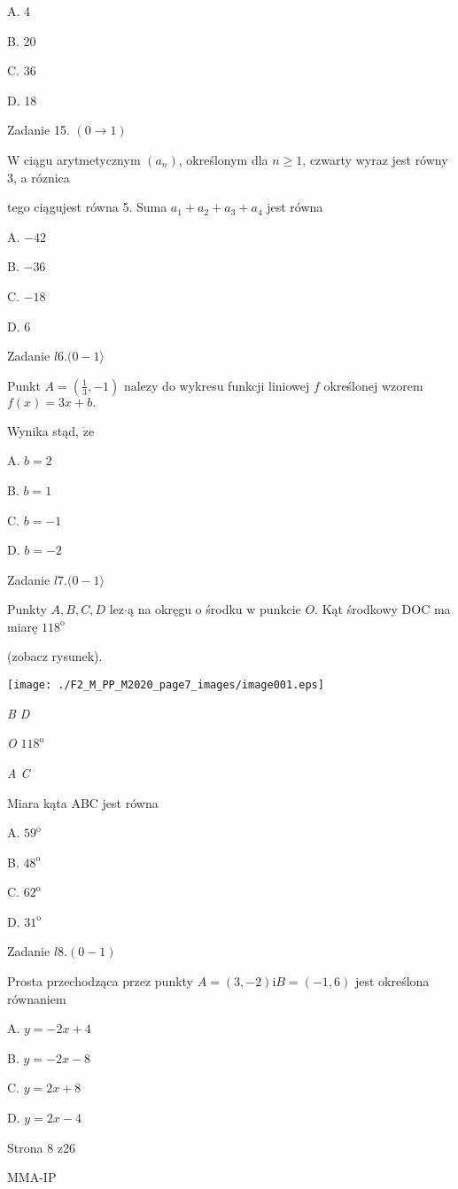 \documentclass[a4paper,12pt]{article}
\begin{document}
A. 4

B. 20

C. 36

D. 18

Zadanie 15. $(0\rightarrow 1)$

$\mathrm{W}$ ciągu arytmetycznym $(a_{n})$, określonym dla $n\geq 1$, czwarty wyraz jest równy 3, a róznica

tego ciągujest równa 5. Suma $a_{1}+a_{2}+a_{3}+a_{4}$ jest równa

A. $-42$

B. $-36$

C. $-18$

D. 6

Zadanie $l6. (0-1\rangle$

Punkt $A=(\displaystyle \frac{1}{3},-1)$ nalezy do wykresu funkcji liniowej $f$ określonej wzorem $f(x)=3x+b.$

Wynika stąd, $\dot{\mathrm{z}}\mathrm{e}$

A. $b=2$

B. $b=1$

C. $b=-1$

D. $b=-2$

Zadanie $l7. (0-1\rangle$

Punkty $A, B, C, D$ lez$\cdot$ą na okręgu o środku w punkcie $O$. Kąt środkowy DOC ma miarę $118^{\mathrm{o}}$

(zobacz rysunek).
\begin{center}
\texttt{[image: ./F2\_M\_PP\_M2020\_page7\_images/image001.eps]}
\end{center}
{\it B D}

{\it O}  $118^{\mathrm{o}}$

{\it A C}

Miara kąta ABC jest równa

A. $59^{\mathrm{o}}$

B. $48^{\mathrm{o}}$

C. $62^{\mathrm{o}}$

D. $31^{\mathrm{o}}$

Zadanie $l8. (0-1)$

Prosta przechodząca przez punkty $A=(3,-2)\mathrm{i}B=(-1,6)$ jest określona równaniem

A. $y=-2x+4$

B. $y=-2x-8$

C. $y=2x+8$

D. $y=2x-4$

Strona 8 z26

MMA-IP
\end{document}
